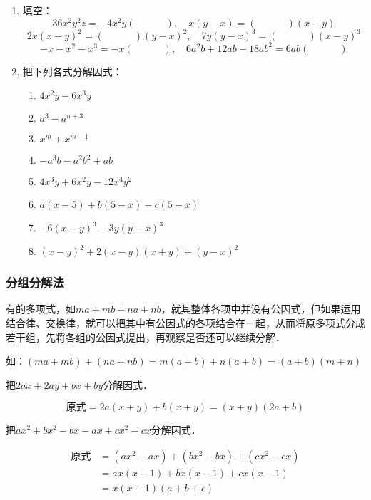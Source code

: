 \begin{ex}
\begin{enumerate}
    \item 填空：
\[36x^2y^2z=-4x^2y(\qquad\quad),\quad x(y-x)=(\qquad\quad)(x-y)  \]
\[2x(x-y)^2=(\qquad\quad)(y-x)^2,\quad 7y(y-x)^3=(\qquad\quad)(x-y)^3\]
\[-x-x^2-x^3=-x(\quad\qquad),\quad 6a^2b+12ab-18ab^2=6ab(\quad\qquad)\]

\item 把下列各式分解因式：
\begin{enumerate}
    \item $4x^2y-6x^3y$
    \item $a^3-a^{n+3}$
    \item $x^m+x^{m-1}$
    \item $-a^3b-a^2b^2+ab$
    \item $4x^3y+6x^2y-12x^4y^2$
    \item $a(x-5)+b(5-x)-c(5-x)$
    \item $-6(x-y)^3-3y(y-x)^3$
    \item $(x-y)^2+2(x-y)(x+y)+(y-x)^2$
\end{enumerate}
\end{enumerate}
\end{ex}

\subsubsection{分组分解法}
有的多项式，如$ma+mb+na+nb$，就其整体各项中并没有公因式，但如果运用结合律、交换律，就可以把其中有公因式的各项结合在一起，从而将原多项式分成若干组，先将各组的公因式提出，再观察是否还可以继续分解．

如：$(ma+mb)+(na+nb)=m(a+b)+n(a+b)=(a+b)(m+n)$

\begin{example}
    把$2ax+2ay+bx+by$分解因式．
\end{example}

\begin{solution}
    \[\text{原式}=2a(x+y)+b(x+y)
    = (x+y) (2a+b)\]
\end{solution}

\begin{example}
    把$ax^2+bx^2-bx-ax+cx^2-cx$分解因式．
\end{example}

\begin{solution}
\[\begin{split}
    \text{原式}&=(ax^2-ax)+(bx^2-bx)+(cx^2-cx)\\
&=ax (x-1) +bx (x-1) +cx (x-1)\\
&=x (x-1) (a+b+c)
\end{split}\]    
\end{solution}

